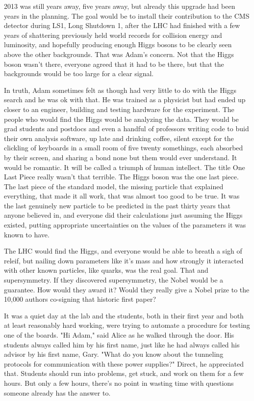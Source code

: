 2013 was still years away, five years away, but already this upgrade had been years in the planning. The goal would be to install their contribution to the CMS detector during LS1, Long Shutdown 1, after the LHC had finished with a few years of shattering previously held world records for collision energy and luminosity, and hopefully producing enough Higgs bosons to be clearly seen above the other backgrounds. That was Adam's concern. Not that the Higgs boson wasn't there, everyone agreed that it had to be there, but that the backgrounds would be too large for a clear signal. 

In truth, Adam sometimes felt as though had very little to do with the Higgs search and he was ok with that. He was trained as a physicist but had ended up closer to an engineer, building and testing hardware for the experiment. The people who would find the Higgs would be analyzing the data. They would be grad students and postdocs and even a handful of professors writing code to buid their own analysis software, up late and drinking coffee, silent except for the clickling of keyboards in a small room of five twenty somethings, each absorbed by their screen, and sharing a bond none but them would ever understand. It would be romantic. It will be called a triumph of human intellect. The title One Last Piece really wasn't that terrible. The Higgs boson was the one last piece. The last piece of the standard model, the missing particle that explained everything, that made it all work, that was almost too good to be true. It was the last genuinely new particle to be predicted in the past thirty years that anyone believed in, and everyone did their calculations just assuming the Higgs existed, putting appropriate uncertainties on the values of the parameters it was known to have.

The LHC would find the Higgs, and everyone would be able to breath a sigh of releif, but nailing down parameters like it's mass and how strongly it interacted with other known particles, like quarks, was the real goal. That and supersymmetry. If they discovered supersymmetry, the Nobel would be a guarantee. How would they award it? Would they really give a Nobel prize to the 10,000 authors co-signing that historic first paper?

\mypause

It was a quiet day at the lab and the students, both in their first year and both at least reasonably hard working, were trying to automate a procedure for testing one of the boards. "Hi Adam," said Alice as he walked through the door. His students always called him by his first name, just like he had always called his advisor by his first name, Gary. "What do you know about the tunneling protocols for communication with these power supplies?" Direct, he appreciated that. Students should run into problems, get stuck, and work on them for a few hours. But only a few hours, there's no point in wasting time with questions someone already has the answer to. 

